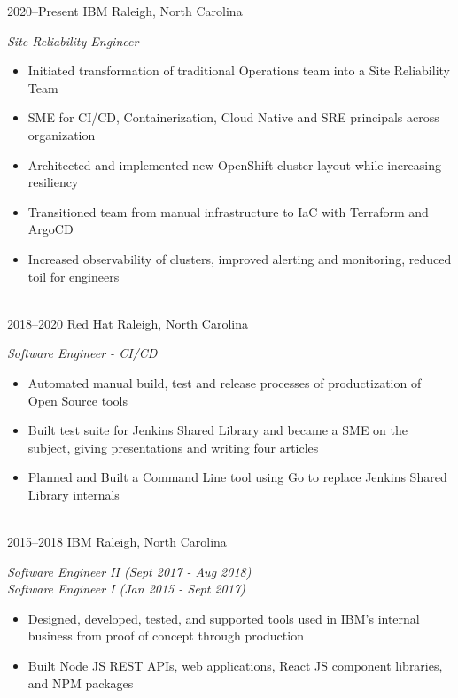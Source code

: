 \documentclass[]{friggeri-cv} %
\begin{document}
\begin{entrylist}
\entry
{2020--Present}
{IBM}
{Raleigh, North Carolina}
{\emph{Site Reliability Engineer}
    \begin{itemize}
        \item Initiated transformation of traditional Operations team into a Site Reliability Team
        \item SME for CI/CD, Containerization, Cloud Native and SRE principals across organization
        \item Architected and implemented new OpenShift cluster layout while increasing resiliency
        \item Transitioned team from manual infrastructure to IaC with Terraform and ArgoCD
        \item Increased observability of clusters, improved alerting and monitoring, reduced toil for engineers
    \end{itemize}}\\

\entry
{2018--2020}
{Red Hat}
{Raleigh, North Carolina}
{\emph{Software Engineer - CI/CD}
 \begin{itemize}
        \item Automated manual build, test and release processes of productization of Open Source tools
        \item Built test suite for Jenkins Shared Library and became a SME on the subject, giving presentations and writing four articles
        \item Planned and Built a Command Line tool using Go to replace Jenkins Shared Library internals
    \end{itemize}}\\

\entry
{2015--2018}
{IBM}
{Raleigh, North Carolina}
{\emph{Software Engineer II (Sept 2017 - Aug 2018)} \\
\emph{Software Engineer I (Jan 2015 - Sept 2017)}
\begin{itemize}
        \item Designed, developed, tested, and supported tools used in IBM's internal business from proof of concept through production
        \item Built Node JS REST APIs, web applications, React JS component libraries, and NPM packages
    \end{itemize}}\\

\end{entrylist}
\end{document}
